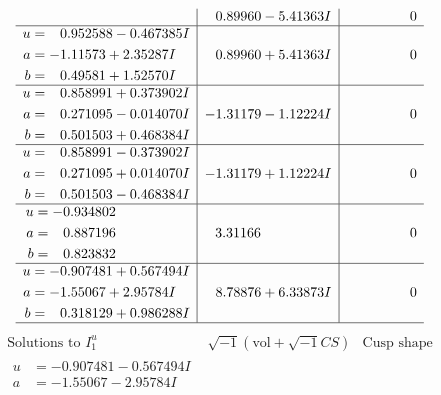 \documentclass[1p]{elsarticle_modified}
\theoremstyle{definition}
\newcommand{\I}{\sqrt{-1}}
\begin{document}
$$\begin{array}{c|c|c}
 & \phantom{-}0.89960 - 5.41363 I & \phantom{-0.000000 } 0 \\ \hline\begin{aligned}
u &= \phantom{-}0.952588 - 0.467385 I \\
a &= -1.11573 + 2.35287 I \\
b &= \phantom{-}0.49581 + 1.52570 I\end{aligned}
 & \phantom{-}0.89960 + 5.41363 I & \phantom{-0.000000 } 0 \\ \hline\begin{aligned}
u &= \phantom{-}0.858991 + 0.373902 I \\
a &= \phantom{-}0.271095 - 0.014070 I \\
b &= \phantom{-}0.501503 + 0.468384 I\end{aligned}
 & -1.31179 - 1.12224 I & \phantom{-0.000000 } 0 \\ \hline\begin{aligned}
u &= \phantom{-}0.858991 - 0.373902 I \\
a &= \phantom{-}0.271095 + 0.014070 I \\
b &= \phantom{-}0.501503 - 0.468384 I\end{aligned}
 & -1.31179 + 1.12224 I & \phantom{-0.000000 } 0 \\ \hline\begin{aligned}
u &= -0.934802\phantom{ +0.000000I} \\
a &= \phantom{-}0.887196\phantom{ +0.000000I} \\
b &= \phantom{-}0.823832\phantom{ +0.000000I}\end{aligned}
 & \phantom{-}3.31166\phantom{ +0.000000I} & \phantom{-0.000000 } 0 \\ \hline\begin{aligned}
u &= -0.907481 + 0.567494 I \\
a &= -1.55067 + 2.95784 I \\
b &= \phantom{-}0.318129 + 0.986288 I\end{aligned}
 & \phantom{-}8.78876 + 6.33873 I & \phantom{-0.000000 } 0\\
 \hline 
 \end{array}$$\newpage$$\begin{array}{c|c|c}  
\text{Solutions to }I^u_{1}& \I (\text{vol} + \sqrt{-1}CS) & \text{Cusp shape}\\
 \hline 
\begin{aligned}
u &= -0.907481 - 0.567494 I \\
a &= -1.55067 - 2.95784 I \\

\end{aligned}
\end{array}$$
\end{document}
